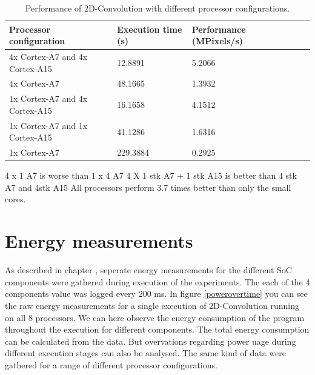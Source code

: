 \begin{table}[H]
  \begin{tabular}{llllll}
    \toprule
    Processor configuration           & Execution time (s)  & Performance (MPixels/s) \\
    \midrule
    4x Cortex-A7 and 4x Cortex-A15    & 12.8891             & 5.2066\\
    4x Cortex-A7                      & 48.1665             & 1.3932\\
    1x Cortex-A7 and 4x Cortex-A15    & 16.1658             & 4.1512\\
    1x Cortex-A7 and 1x Cortex-A15    & 41.1286             & 1.6316\\
    1x Cortex-A7                      & 229.3884            & 0.2925\\
    \bottomrule
  \end{tabular}
  \caption{Performance of 2D-Convolution with different processor configurations. \label{overflow}}
\end{table}


4 x 1 A7 is worse than 1 x 4 A7
4 X 1 stk A7 + 1 stk A15 is better than 4 stk A7 and 4stk A15
All processors perform 3.7 times better than only the small cores.

\section{Energy measurements}
As described in chapter , seperate energy measurements for the different SoC components were gathered during execution of the experiments.
The each of the 4 components value was logged every 200 ms.
In figure \ref{powerovertime} you can see the raw energy measurements for a single execution of 2D-Convolution running on all 8 processors.
We can here observe the energy consumption of the program throughout the execution for different components.
The total energy consumption can be calculated from the data.
But overvations regarding power uage during different execution stages can also be analysed.
The same kind of data were gathered for a range of different processor configurations.

